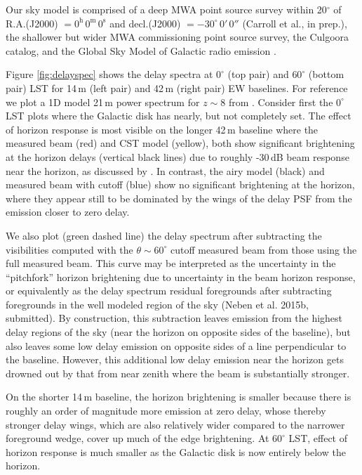 \documentclass{emulateapj}
\begin{document}
Our sky model is comprised of a deep MWA point source survey within 20$^\circ$ of R.A.(J2000) $= 0^\text{h}\,0^\text{m}\,0^\text{s}$ and decl.(J2000) $= -30^\circ\,0'\,0''$ (Carroll et al., in prep.), the shallower but wider MWA commissioning point source survey\citep{MWACS}, the Culgoora catalog\citep{Slee1995}, and the Global Sky Model of Galactic radio emission \citep{gsm}. 

Figure \ref{fig:delayspec} shows the delay spectra at $0^\circ$ (top pair) and $60^\circ$ (bottom pair) LST for 14\,m (left pair) and 42\,m (right pair) EW baselines. For reference we plot a 1D model 21\,m power spectrum for $z\sim8$ from \citet{21cmfast}. Consider first the $0^\circ$ LST plots where the Galactic disk has nearly, but not completely set. The effect of horizon response is most visible on the longer 42\,m baseline where the measured beam (red) and CST model (yellow), both show significant brightening at the horizon delays (vertical black lines) due to roughly -30\,dB beam response near the horizon, as discussed by \citet{nithya15,nithya15}. In contrast, the airy model (black) and measured beam with cutoff (blue) show no significant brightening at the horizon, where they appear still to be dominated by the wings of the delay PSF from the emission closer to zero delay. 

We also plot (green dashed line) the delay spectrum after subtracting the visibilities computed with the $\theta\sim60^\circ$ cutoff measured beam from those using the full measured beam. This curve may be interpreted as the uncertainty in the ``pitchfork'' horizon brightening due to uncertainty in the beam horizon response, or equivalently as the delay spectrum residual foregrounds after subtracting foregrounds in the well modeled region of the sky (Neben et al. 2015b, submitted). By construction, this subtraction leaves emission from the highest delay regions of the sky (near the horizon on opposite sides of the baseline), but also leaves some low delay emission on opposite sides of a line perpendicular to the baseline. However, this additional low delay emission near the horizon gets drowned out by that from near zenith where the beam is substantially stronger. 

On the shorter 14\,m baseline, the horizon brightening is smaller because there is roughly an order of magnitude more emission at zero delay, whose thereby stronger delay wings, which are also relatively wider compared to the narrower foreground wedge, cover up much of the edge brightening. At $60^\circ$ LST, effect of horizon response is much smaller as the Galactic disk is now entirely below the horizon. 
\end{document}
